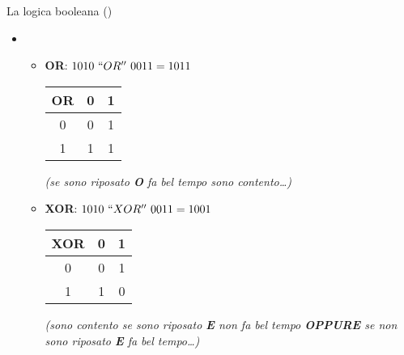 \begin{slide}{La logica booleana ()}
{
	\begin{itemize}

		\item[~]

			\begin{itemize}
			\setlength{\itemsep}{10mm}

				\item {\bfseries OR}: $1010~``OR''~0011 = 1011$
					\hfill
					\begin{tabular}{c | c c}
						OR & 0 & 1\\
						\hline
						0 & 0 & 1\\
						1 & 1 & 1\\
					\end{tabular}

					{\itshape (se sono riposato {\bfseries O}
					  fa bel tempo sono contento\ldots)}

				\item {\bfseries XOR}: $1010~``XOR''~0011 = 1001$
					\hfill
					\begin{tabular}{c | c c}
						XOR & 0 & 1\\
						\hline
						0 & 0 & 1\\
						1 & 1 & 0\\
					\end{tabular}

					{\itshape (sono contento se sono riposato {\bfseries E}
					 non fa bel tempo {\bfseries OPPURE} se non sono riposato
					 {\bfseries E} fa bel tempo\ldots)}

				\end{itemize}

	\end{itemize}
}
\end{slide}
